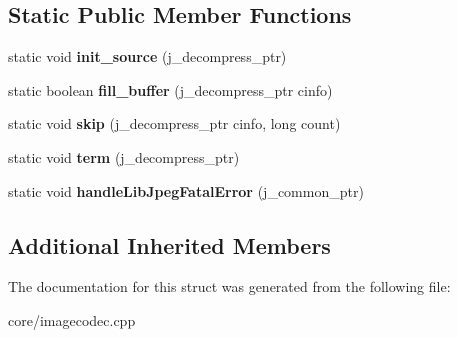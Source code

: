 \subsection*{Static Public Member Functions}
\begin{DoxyCompactItemize}
\item 
\hypertarget{struct_tempest_1_1_jpeg_codec_a1e43c366f23e90a3000e0e801b0eb7ed}{static void {\bfseries init\+\_\+source} (j\+\_\+decompress\+\_\+ptr)}\label{struct_tempest_1_1_jpeg_codec_a1e43c366f23e90a3000e0e801b0eb7ed}

\item 
\hypertarget{struct_tempest_1_1_jpeg_codec_a3bf45c99bb953cd081873a9da4c61361}{static boolean {\bfseries fill\+\_\+buffer} (j\+\_\+decompress\+\_\+ptr cinfo)}\label{struct_tempest_1_1_jpeg_codec_a3bf45c99bb953cd081873a9da4c61361}

\item 
\hypertarget{struct_tempest_1_1_jpeg_codec_aaa23356b0bed05fbf73fccf5c188b9c5}{static void {\bfseries skip} (j\+\_\+decompress\+\_\+ptr cinfo, long count)}\label{struct_tempest_1_1_jpeg_codec_aaa23356b0bed05fbf73fccf5c188b9c5}

\item 
\hypertarget{struct_tempest_1_1_jpeg_codec_ac30f117c65fd781b610b310424455807}{static void {\bfseries term} (j\+\_\+decompress\+\_\+ptr)}\label{struct_tempest_1_1_jpeg_codec_ac30f117c65fd781b610b310424455807}

\item 
\hypertarget{struct_tempest_1_1_jpeg_codec_ae85cc7c36ce5f288d9d5b521138dfbaf}{static void {\bfseries handle\+Lib\+Jpeg\+Fatal\+Error} (j\+\_\+common\+\_\+ptr)}\label{struct_tempest_1_1_jpeg_codec_ae85cc7c36ce5f288d9d5b521138dfbaf}

\end{DoxyCompactItemize}
\subsection*{Additional Inherited Members}


The documentation for this struct was generated from the following file\+:\begin{DoxyCompactItemize}
\item 
core/imagecodec.\+cpp\end{DoxyCompactItemize}
